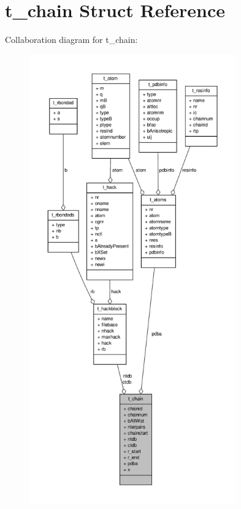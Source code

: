 \hypertarget{structt__chain}{\section{t\-\_\-chain \-Struct \-Reference}
\label{structt__chain}
}


\-Collaboration diagram for t\-\_\-chain\-:
\nopagebreak
\begin{figure}[H]
\begin{center}
\leavevmode
\includegraphics[height=550pt]{structt__chain__coll__graph}
\end{center}
\end{figure}
